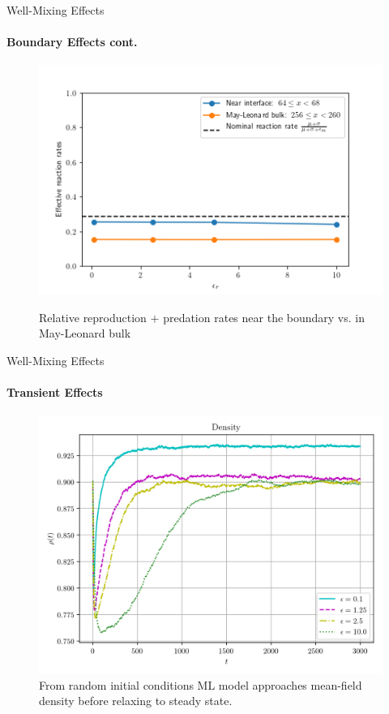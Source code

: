\documentclass{beamer}
\begin{document}
    \begin{frame}[t]{Well-Mixing Effects}
        \framesubtitle{Boundary Effects cont.}
        \begin{figure}[h]
            \centering
            {\includegraphics[width=0.9\linewidth]{images/reaction_rates.png}}
            \caption{ Relative reproduction $+$ predation rates near the boundary 
            vs. in May-Leonard bulk}
            \label{fig:mixing}
        \end{figure}
    \end{frame}

    \begin{frame}[t]{Well-Mixing Effects}
        \framesubtitle{Transient Effects}

        \begin{figure}[h]
            \centering
            \includegraphics[width=0.7\linewidth]{images/densities_try_0.png}
            \caption{ From random initial conditions ML model approaches mean-field density before
            relaxing to steady state.}
            \label{fig:images/densities_try_0}
        \end{figure}
    \end{frame}
\end{document}
